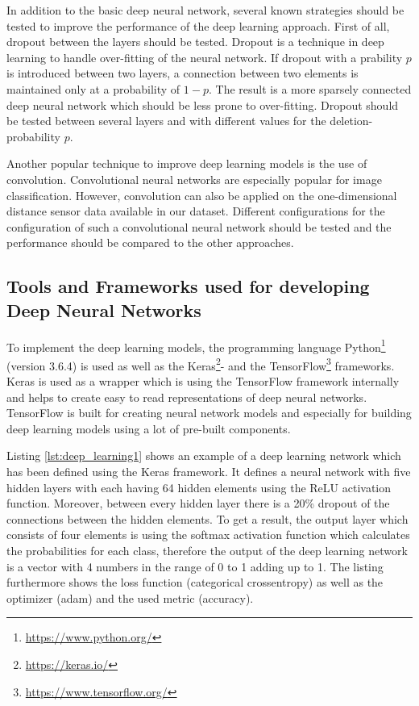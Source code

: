 In addition to the basic deep neural network, several known strategies should be tested to improve the performance of the deep learning approach. First of all, dropout between the layers should be tested. Dropout is a technique in deep learning to handle over-fitting of the neural network. If dropout with a prability $p$ is introduced between two layers, a connection between two elements is maintained only at a probability of $1-p$. The result is a more sparsely connected deep neural network which should be less prone to over-fitting. Dropout should be tested between several layers and with different values for the deletion-probability $p$.

Another popular technique to improve deep learning models is the use of convolution. Convolutional neural networks are especially popular for image classification. However, convolution can also be applied on the one-dimensional distance sensor data available in our dataset. Different configurations for the configuration of such a convolutional neural network should be tested and the performance should be compared to the other approaches.

\subsection{Tools and Frameworks used for developing Deep Neural Networks}

To implement the deep learning models, the programming language Python\footnote{\url{https://www.python.org/}} (version 3.6.4) is used as well as the Keras\footnote{\url{https://keras.io/}}- and the TensorFlow\footnote{\url{https://www.tensorflow.org/}} frameworks. Keras is used as a wrapper which is using the TensorFlow framework internally and helps to create easy to read representations of deep neural networks. TensorFlow is built for creating neural network models and especially for building deep learning models using a lot of pre-built components. 


Listing \ref{lst:deep_learning1} shows an example of a deep learning network which has been defined using the Keras framework. It defines a neural network with five hidden layers with each having 64 hidden elements using the ReLU activation function. Moreover, between every hidden layer there is a 20\% dropout of the connections between the hidden elements. To get a result, the output layer which consists of four elements is using the softmax activation function which calculates the probabilities for each class, therefore the output of the deep learning network is a vector with 4 numbers in the range of 0 to 1 adding up to 1. The listing furthermore shows the loss function (categorical crossentropy) as well as the optimizer (adam) and the used metric (accuracy).







